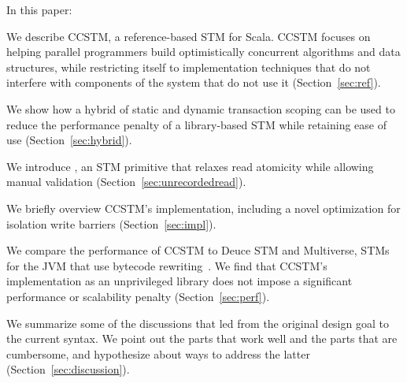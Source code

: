 In this paper:
\begin{packed_enum}

\item We describe CCSTM, a reference-based STM for Scala.  CCSTM focuses
on helping parallel programmers build optimistically concurrent algorithms
and data structures, while restricting itself to implementation techniques
that do not interfere with components of the system that do not use it
(Section~\ref{sec:ref}).

\item We show how a hybrid of static and dynamic transaction scoping can
be used to reduce the performance penalty of a library-based STM while
retaining ease of use (Section~\ref{sec:hybrid}).

\item We introduce , an STM primitive that relaxes
read atomicity while allowing manual validation
(Section~\ref{sec:unrecordedread}).


\item We briefly overview CCSTM's implementation, including a
novel optimization for isolation write barriers
(Section~\ref{sec:impl}).

\item We compare the performance of CCSTM to Deuce STM and Multiverse,
STMs for the JVM that use bytecode rewriting~\cite{deucestm,multiverse}.
We find that CCSTM's implementation as an unprivileged library
does not impose a significant performance or scalability penalty
(Section~\ref{sec:perf}).

\item We summarize some of the discussions that led from the original
design goal to the current syntax.  We point out the parts that work
well and the parts that are cumbersome, and hypothesize about ways to
address the latter (Section~\ref{sec:discussion}).

\end{packed_enum}

